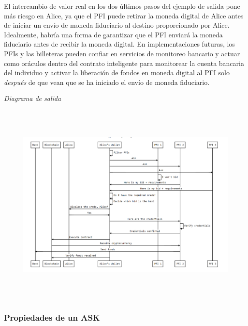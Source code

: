 \documentclass[11pt]{article}
\begin{document}
\vspace{1\baselineskip}
El intercambio de valor real en los dos últimos pasos del ejemplo de salida pone más riesgo en Alice, ya que el PFI puede retirar la moneda digital de Alice antes de iniciar un envío de moneda fiduciario al destino proporcionado por Alice. \textcolor[HTML]{202124}{Idealmente, habría una forma de garantizar que el PFI enviará la moneda fiduciario antes de recibir la moneda digital.} En implementaciones futuras, los PFIs y las billeteras pueden confiar en servicios de monitoreo bancario y actuar como oráculos dentro del contrato inteligente para monitorear la cuenta bancaria del individuo y activar la liberación de fondos en moneda digital al PFI solo \textit{después} de que vean que se ha iniciado el envío de moneda fiduciario\textcolor[HTML]{3C4043}{.}

\vspace{9\baselineskip}
\begin{center}
\textit{\textcolor[HTML]{3C4043}{Diagrama de salida}}
\end{center}

\vspace{1\baselineskip}
\textcolor[HTML]{3C4043}{\begin{figure}[H]
\includegraphics[width=15.48cm,height=10.29cm]{./diagrams/off-ramp.png}
\end{figure}
}

\vspace{1\baselineskip}
\subsubsection{Propiedades de un ASK}
\end{document}
